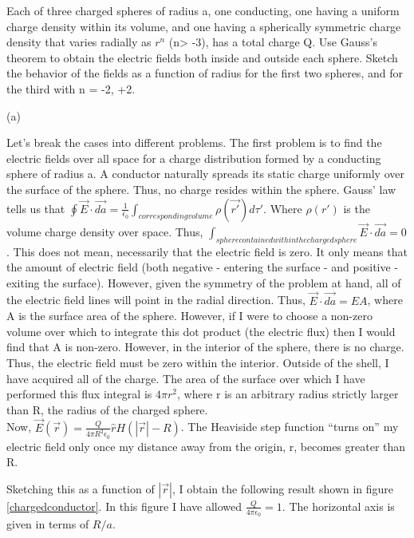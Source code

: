 \begin{homeworkProblem}

Each of three charged spheres of radius a, one conducting, one having a uniform 
charge density within its volume, and one having a spherically symmetric charge 
density that varies radially as $r^n$ (n> -3), has a total charge Q. Use Gauss's theorem 
to obtain the electric fields both inside and outside each sphere. Sketch the behavior 
of the fields as a function of radius for the first two spheres, and for the third with 
n = -2, +2. 

\begin{homeworkSection}{(a)}

Let's break the cases into different problems. The first problem is to find the electric fields over all space for a charge distribution formed by a conducting sphere of radius a. A conductor naturally spreads its static charge uniformly over the surface of the sphere. Thus, no charge resides within the sphere. Gauss' law tells us that $\oint \vec{E}\cdot \vec{da} = \frac{1}{\epsilon_0} \int_{correspondingvolume} \rho(\vec{r'})d\tau'$. Where $\rho(r')$ is the volume charge density over space. Thus, $\int_{sphere contained within the charged sphere} \vec{E} \cdot \vec{da} = 0$. This does not mean, necessarily that the electric field is zero. It only means that the amount of electric field (both negative - entering the surface - and positive - exiting the surface). However, given the symmetry of the problem at hand, all of the electric field lines will point in the radial direction. Thus, $\vec{E}\cdot \vec{da} = E A$, where A is the surface area of the sphere. However, if I were to choose a non-zero volume over which to integrate this dot product (the electric flux) then I would find that A is non-zero. However, in the interior of the sphere, there is no charge. Thus, the electric field must be zero within the interior. Outside of the shell, I have acquired all of the charge. The area of the surface over which I have performed this flux integral is $4\pi r^2$, where r is an arbitrary radius strictly larger than R, the radius of the charged sphere.
\\
Now, $\vec{E}(\vec{r})= \frac{Q}{4\pi R^2 \epsilon_0} \hat{r} H(|\vec{r}|-R)$. The Heaviside step function ``turns on'' my electric field only once my distance away from the origin, r, becomes greater than R.

Sketching this as a function of $|\vec{r}|$, I obtain the following result shown in figure \ref{chargedconductor}. In this figure I have allowed $\frac{Q}{4\pi \epsilon_0} = 1$. The horizontal axis is given in terms of $R/a$.


\end{homeworkSection}
\end{homeworkProblem}
